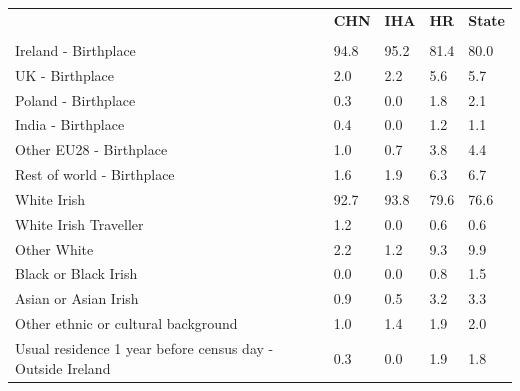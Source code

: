 \documentclass{article}
\begin{document}
\pagebreak
\begin{table}[h]	
\centering
		\begin{tabular}{KTTTT}
  \hline
& \textbf{CHN} & \textbf{IHA} & \textbf{HR}& \textbf{State}\\ 
  \hline
    \\ 
    \hline
Ireland - Birthplace & 94.8& 95.2& 81.4& 80.0\\
UK - Birthplace & 2.0& 2.2& 5.6& 5.7\\
Poland - Birthplace & 0.3& 0.0& 1.8& 2.1\\
India - Birthplace & 0.4& 0.0& 1.2& 1.1\\
Other EU28 - Birthplace & 1.0& 0.7& 3.8& 4.4\\
Rest of world - Birthplace & 1.6& 1.9& 6.3& 6.7\\
    \hline
White Irish & 92.7& 93.8& 79.6& 76.6\\
White Irish Traveller & 1.2& 0.0& 0.6& 0.6\\
Other White & 2.2& 1.2& 9.3& 9.9\\
Black or Black Irish & 0.0& 0.0& 0.8& 1.5\\
Asian or Asian Irish & 0.9& 0.5& 3.2& 3.3\\
Other ethnic or cultural background & 1.0& 1.4& 1.9& 2.0\\
    \hline
Usual residence 1 year before census day - Outside Ireland & 0.3& 0.0& 1.9& 1.8\\


\end{tabular}
\end{table}
\end{document}
